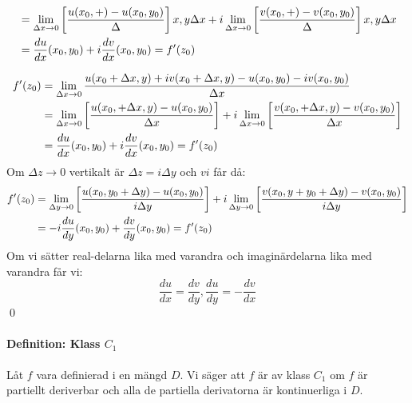 \newcommand{\uberBracket}[6] {
	\begin{align*}
		&= \bracketDelta #2 u #3 #4 + i \bracketDelta #2 v #3 #4 \\
		&= #5 \frac {d u} {d #2} (#2_0, #6_0) + i \frac {dv} {d #2} (x_0, y_0) = f'(z_0)
	\end{align*}
}

\uberBracket{
	f'(z_0) &= \lim_{\xtz} \frac {
		u(x_0 + \Delta x, y) + iv(x_0 + \Delta x, y) - u(x_0, y_0) - iv(x_0, y_0)
		} {
			\Delta x
		} \\
} {x} {+ \Delta x,y} {\Delta x} {} {y}

\begin{align*}
	f'(z_0) &=  \lim_{\Delta x \to 0} \frac {
		u(x_0 + \Delta x, y) + iv(x_0 + \Delta x, y) - u(x_0, y_0) - iv(x_0, y_0)
	} {
		\Delta x
	} \\
	&= \lim_{\Delta x \to 0} \left [ \frac { u(x_0, + \Delta x,y) - u(x_0, y_0) } { \Delta x } \right ] 
	+ i \lim_{\Delta x \to 0} \left [ \frac { v(x_0, + \Delta x,y) - v(x_0, y_0) } { \Delta x } \right ] \\
	&= \frac {d u} {d x} (x_0, y_0) + i \frac {d v} {d x} (x_0, y_0) = f'(z_0)
\end{align*}
Om $\Delta z \to 0$ vertikalt är $\Delta z = i \Delta y$ och $vi$ får då:
\begin{align*}
	f'(z_0)
	&= \lim_{\Delta y \to 0} \left [ \frac { u(x_0, y_0 + \Delta y) - u(x_0, y_0) } { i \Delta y } \right ]
	+ i \lim_{\Delta y \to 0} \left [ \frac { v(x_0, y + y_0 + \Delta y) - v(x_0, y_0) } { i\Delta y } \right ] \\
	&= - i \frac {d u} {d y} (x_0, y_0) + \frac {d v} {d y} (x_0, y_0) = f'(z_0)
\end{align*}
Om vi sätter real-delarna lika med varandra och imaginärdelarna lika med varandra får vi:
$$\frac {d u} {d x} = \frac {d v} {d y}, \frac {d u} {d y} = -
	\frac {d v} {d x}$$
\hfill \qed

\paragraph{Definition: Klass $C_1$}
Låt $f$ vara definierad i en mängd $D$. Vi säger att $f$ är av klass $C_1$ om $f$ är partiellt deriverbar och
alla de partiella derivatorna är kontinuerliga i $D$.\\
\\
